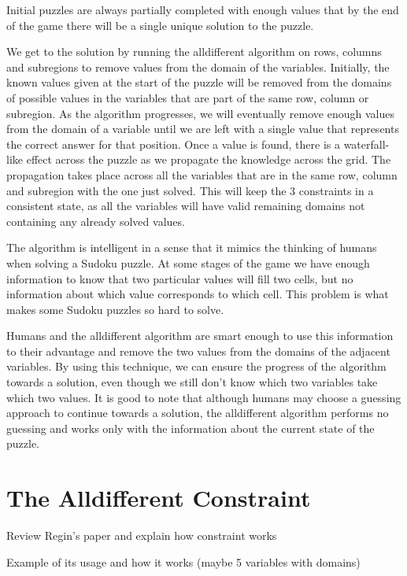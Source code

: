 \documentclass{l4proj}
\begin{document}
\noindent Initial puzzles are always partially completed with enough values that by the end of the game there will be a single unique solution to the puzzle. 

\noindent We get to the solution by running the alldifferent algorithm on rows, columns and subregions to remove values from the domain of the variables. Initially, the known values given at the start of the puzzle will be removed from the domains of possible values in the variables that are part of the same row, column or subregion. As the algorithm progresses, we will eventually remove enough values from the domain of a variable until we are left with a single value that represents the correct answer for that position. Once a value is found, there is a waterfall-like effect across the puzzle as we propagate the knowledge across the grid. The propagation takes place across all the variables that are in the same row, column and subregion with the one just solved. This will keep the 3 constraints in a consistent state, as all the variables will have valid remaining domains not containing any already solved values.

\noindent The algorithm is intelligent in a sense that it mimics the thinking of humans when solving a Sudoku puzzle. At some stages of the game we have enough information to know that two particular values will fill two cells, but no information about which value corresponds to which cell. This problem is what makes some Sudoku puzzles so hard to solve.

\noindent Humans and the alldifferent algorithm are smart enough to use this information to their advantage and remove the two values from the domains of the adjacent variables. By using this technique, we can ensure the progress of the algorithm towards a solution, even though we still don’t know which two variables take which two values. It is good to note that although humans may choose a guessing approach to continue towards a solution, the alldifferent algorithm performs no guessing and works only with the information about the current state of the puzzle.

\section{The Alldifferent Constraint}
\noindent Review Regin’s paper and explain how constraint works \cite{regin1994filtering}

\noindent Example of  its usage and how it works (maybe 5 variables with domains)
\end{document}
